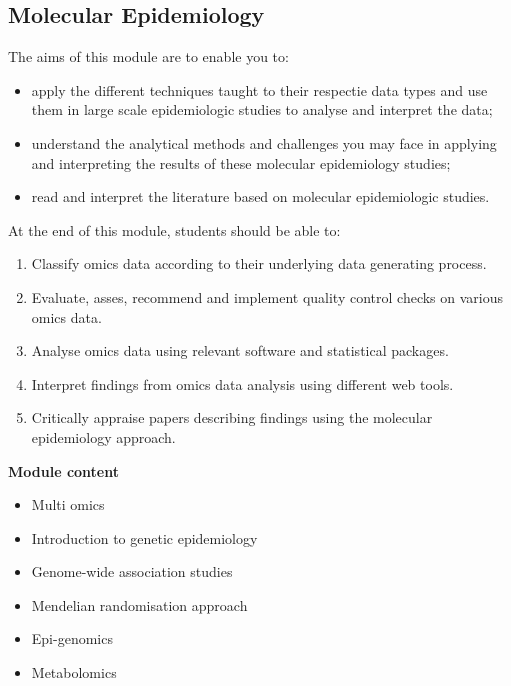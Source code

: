 \documentclass[
]{book}
\providecommand{\tightlist}{%
  \setlength{\itemsep}{0pt}\setlength{\parskip}{0pt}}
\begin{document}
\subsection*{Molecular Epidemiology}\label{molecular-epidemiology}

The aims of this module are to enable you to:

\begin{itemize}
\item
  apply the different techniques taught to their respectie data types and use them in large scale epidemiologic studies to analyse and interpret the data;
\item
  understand the analytical methods and challenges you may face in applying and interpreting the results of these molecular epidemiology studies;
\item
  read and interpret the literature based on molecular epidemiologic studies.
\end{itemize}

At the end of this module, students should be able to:

\begin{enumerate}
\def\labelenumi{\arabic{enumi}.}
\tightlist
\item
  Classify omics data according to their underlying data generating process.
\item
  Evaluate, asses, recommend and implement quality control checks on various omics data.
\item
  Analyse omics data using relevant software and statistical packages.
\item
  Interpret findings from omics data analysis using different web tools.
\item
  Critically appraise papers describing findings using the molecular epidemiology approach.
\end{enumerate}

\textbf{Module content}

\begin{itemize}
\tightlist
\item
  Multi omics
\item
  Introduction to genetic epidemiology
\item
  Genome-wide association studies
\item
  Mendelian randomisation approach
\item
  Epi-genomics
\item
  Metabolomics
\end{itemize}
\end{document}
